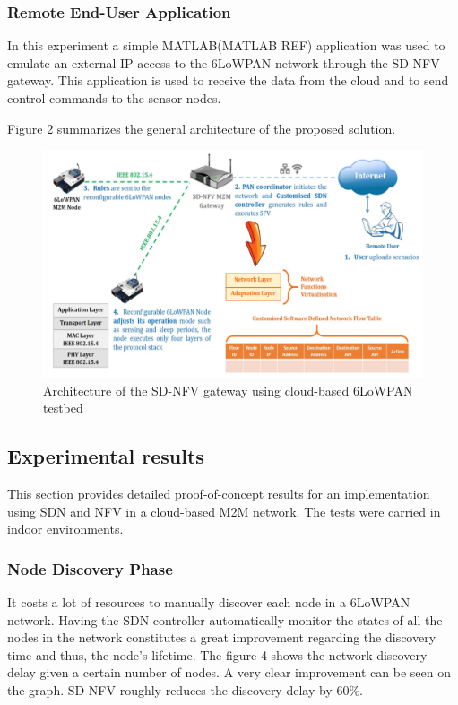 \documentclass[10pt,journal,compsoc]{IEEEtran}
\begin{document}
\subsubsection{Remote End-User Application}

In this experiment a simple MATLAB(MATLAB REF) application was used to 
emulate an external IP access to the 6LoWPAN network through the 
SD-NFV gateway. This application is used to receive the data from the 
cloud and to send control commands to the sensor nodes.

Figure 2 summarizes the general architecture of the proposed solution.

\begin{figure}
    \includegraphics[width=\textwidth]{architecture}
    \caption{Architecture of the SD-NFV gateway using cloud-based 
    6LoWPAN testbed}
\end{figure}

\subsection{Experimental results}

This section provides detailed proof-of-concept results for an 
implementation using SDN and NFV in a cloud-based M2M network. The 
tests were carried in indoor environments. 

\subsubsection{Node Discovery Phase}

It costs a lot of resources to manually discover each node in a 
6LoWPAN network. Having the SDN controller automatically monitor the 
states of all the nodes in the network constitutes a great improvement 
regarding the discovery time and thus, the node's lifetime. The figure 4 
shows the network discovery delay given a certain number of nodes. 
A very clear improvement can be seen on the graph. SD-NFV roughly 
reduces the discovery delay by 60\%. 
\end{document}
